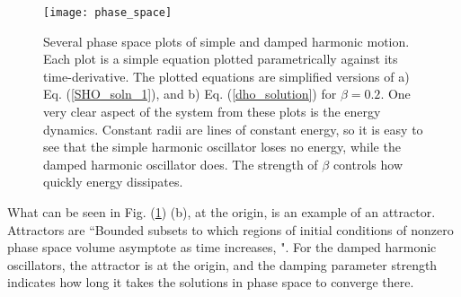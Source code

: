 \documentclass[12pt,twoside]{reedthesis}
\begin{document}
\begin{figure}[h]
\centering
\texttt{[image: phase\_space]} 
\caption{Several phase space plots of simple and damped harmonic motion.  Each plot is a simple equation plotted parametrically against its time-derivative.  The plotted equations are simplified versions of a) Eq. (\ref{SHO_soln_1}), and b) Eq. (\ref{dho_solution}) for $\beta = 0.2$.  One very clear aspect of the system from these plots is the energy dynamics.  Constant radii are lines of constant energy, so it is easy to see that the simple harmonic oscillator loses no energy, while the damped harmonic oscillator does.  The strength of $\beta$ controls how quickly energy dissipates.}
\label{attractors_demonstration}
\end{figure}

What can be seen in Fig. (\ref{attractors_demonstration}) (b), at the origin, is an example of an attractor.  Attractors are ``Bounded subsets to which regions of initial conditions of nonzero phase space volume asymptote as time increases, \cite{strogatz1994}".  For the damped harmonic oscillators, the attractor is at the origin, and the damping parameter strength indicates how long it takes the solutions in phase space to converge there.






\end{document}

